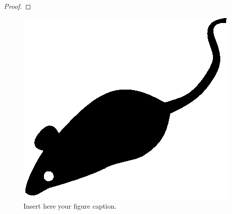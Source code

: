 \begin{quote}
\lipsum[1]
\end{quote}

\begin{theorem}
	\label{thm:sample}
	\lipsum[1]
	\begin{proof}
		\lipsum[1]
	\end{proof}
\end{theorem}

\begin{corollary}
	\label[cor]{cor:sample}
	\lipsum[1]
\end{corollary}

\begin{lemma}
	\label[lem]{lem:sample}
	\lipsum[1]
\end{lemma}


\begin{figure}[tp]
	\centering
	\includegraphics{./fig/acmlarge-mouse}
	\caption{Insert here your figure caption.}
		\label{fig:sample-1}
\end{figure}


